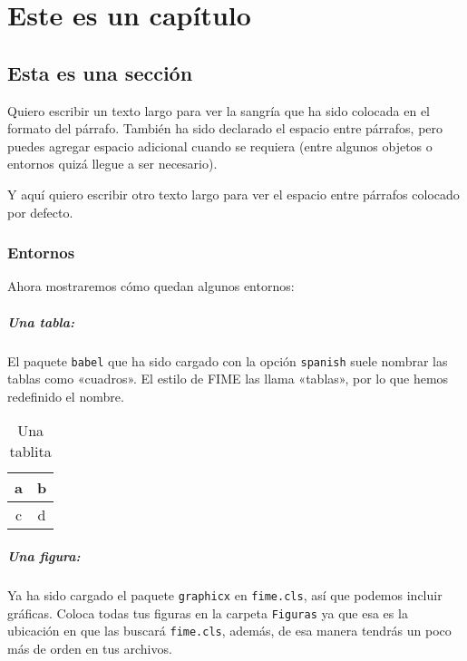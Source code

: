 \chapter{Este es un capítulo}

\section{Esta es una sección}

Quiero escribir un texto largo para ver la sangría que ha sido colocada en el formato del párrafo. También ha sido declarado el espacio entre párrafos, pero puedes agregar espacio adicional cuando se requiera (entre algunos objetos o entornos quizá llegue a ser necesario).

Y aquí quiero escribir otro texto largo para ver el espacio entre párrafos colocado por defecto.

\subsection{Entornos}

Ahora mostraremos cómo quedan algunos entornos:

\paragraph{Una tabla:} El paquete {\tt babel} que ha sido cargado con la opción {\tt spanish} suele nombrar las tablas como «cuadros». El estilo de FIME las llama «tablas», por lo que hemos redefinido el nombre.

\begin{table}[ht]
	\centering
		\begin{tabular}{|c|c|}
			\hline
			a & b \\
			\hline
			c & d \\
			\hline
		\end{tabular}
	\caption{Una tablita}
	\label{tab:una-tablita}
\end{table}

\paragraph{Una figura:} Ya ha sido cargado el paquete {\tt graphicx} en {\tt fime.cls}, así que podemos incluir gráficas. Coloca todas tus figuras en la carpeta {\tt Figuras} ya que esa es la ubicación en que las buscará {\tt fime.cls}, además, de esa manera tendrás un poco más de orden en tus archivos.

